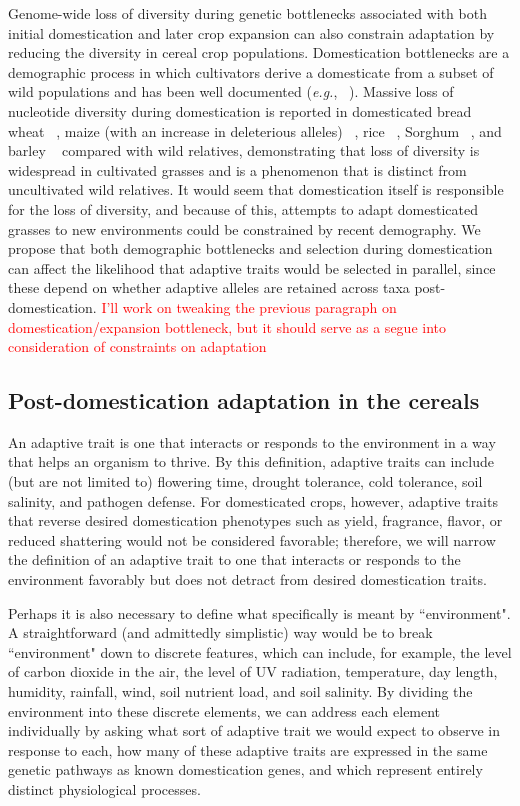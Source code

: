 \documentclass[12pt]{article}
\newcommand{\mbh}[1]{\textcolor{red}{\normalsize  #1}}
\begin{document}
Genome-wide loss of diversity during genetic bottlenecks associated with both initial domestication and later crop expansion can also constrain adaptation by reducing the diversity in cereal crop populations. Domestication bottlenecks are a demographic process in which cultivators derive a domesticate from a subset of wild populations and has been well documented (\emph{e.g.}, ~\citep{Wang2017}).
Massive loss of nucleotide diversity during domestication is reported in domesticated bread wheat ~\citep{Haudry2007}, maize (with an increase in deleterious alleles) ~\citep{pmid9539756, Wang2017}, rice ~\citep{pmid17218640}, Sorghum ~\citep{Hamblin2006}, and barley ~\citep{Kilian2006} compared with wild relatives, demonstrating that loss of diversity is widespread in cultivated grasses and is a phenomenon that is distinct from uncultivated wild relatives. It would seem that domestication itself is responsible for the loss of diversity, and because of this, attempts to adapt domesticated grasses to new environments could be constrained by recent demography.  
We propose that both demographic bottlenecks and selection during domestication can affect the likelihood that adaptive traits would be selected in parallel, since these depend on whether adaptive alleles are retained across taxa post-domestication. \mbh{I'll work on tweaking the previous paragraph on domestication/expansion bottleneck, but it should serve as a segue into consideration of constraints on adaptation}


\subsection*{Post-domestication adaptation in the cereals}

An adaptive trait is one that interacts or responds to the environment in a way that helps an organism to thrive. 
By this definition, adaptive traits can include (but are not limited to) flowering time, drought tolerance, cold tolerance, soil salinity, and pathogen defense. 
For domesticated crops, however, adaptive traits that reverse desired domestication phenotypes such as yield, fragrance, flavor, or reduced shattering would not be considered favorable; therefore, we will narrow the definition of an adaptive trait to one that interacts or responds to the environment favorably but does not detract from desired domestication traits. 

Perhaps it is also necessary to define what specifically is meant by ``environment".
A straightforward (and admittedly simplistic) way would be to break ``environment" down to discrete features, which can include, for example, the level of carbon dioxide in the air, the level of UV radiation, temperature, day length, humidity, rainfall, wind, soil nutrient load, and soil salinity. 
By dividing the environment into these discrete elements, we can address each element individually by asking what sort of adaptive trait we would expect to observe in response to each, how many of these adaptive traits are expressed in the same genetic pathways as known domestication genes, and which represent entirely distinct physiological processes.
\end{document}
